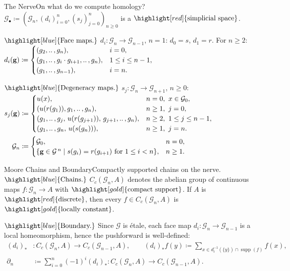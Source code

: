\documentclass[aspectratio=169]{beamer}
\renewcommand{\ldots}{
  \mathinner{{\ldotp}{\ldotp}}
}
\newcommand{\G}{\mathcal{G}}
\newcommand{\supp}{\operatorname{supp}}
\begin{document}
\begin{frame}{The Nerve}{On what do we compute homology?}
  \(\G_\bullet\coloneqq (\G_n,(d_i)_{i=0}^n,(s_j)_{j=0}^n)_{n\ge 0}\) is a \(\highlight[red]{\text{simplicial space}}\).
  \pause

  \(\highlight[blue]{\text{Face maps.}}\)
  \(d_i\colon \G_n\to \G_{n-1}\), \(n=1\): \(d_0=s\), \(d_1=r\). For \(n\ge 2\):
  \(
    d_i(\mathbf{g})\coloneqq
    \begin{cases}
      (g_2,\ldots,g_n), & i=0,\\
      (g_1,\ldots,g_i\cdot g_{i+1},\ldots,g_n), & 1\le i\le n-1,\\
      (g_1,\ldots,g_{n-1}), & i=n.
    \end{cases}
  \)
  \pause
  \vspace{0.2cm}

  \(\highlight[blue]{\text{Degeneracy maps.}}\)
  \(s_j\colon \G_n\to \G_{n+1}\), \(n\ge 0\):
  \vspace{-0.3em}
  \(
  \begin{aligned}
    s_j(\mathbf{g}) &\coloneqq \begin{cases}
      u(x), & n=0,\ x\in \G_0,\\
      (u(r(g_1)),g_1,\ldots,g_n), & n\ge 1,\ j=0,\\
      (g_1,\ldots,g_j,\,u(r(g_{j+1})),\,g_{j+1},\ldots,g_n), & n\ge 2,\ 1\le j\le n-1,\\
      (g_1,\ldots,g_n,\,u(s(g_n))), & n\ge 1,\ j=n.
    \end{cases}\\
   \G_n &\coloneqq
    \begin{cases}
      \G_0, & n=0,\\
      \{\mathbf{g} \in \G^{\,n}\mid s(g_i)=r(g_{i+1})\ \text{for}\ 1\le i<n\}, & n\ge 1.
    \end{cases}
  \end{aligned}
  \)
\end{frame}

\begin{frame}{Moore Chains and Boundary}{Compactly supported chains on the nerve.}
  \(\highlight[blue]{\text{Chains.}}\)
  \(C_c(\G_n,A)\) denotes the abelian group of continuous maps \(f\colon \G_n\to A\) with \(\highlight[gold]{\text{compact support}}\).
  If \(A\) is \(\highlight[red]{\text{discrete}}\), then every \(f\in C_c(\G_n,A)\) is \(\highlight[gold]{\text{locally constant}}\).
  \pause
  \vspace{0.3cm}

  \(\highlight[blue]{\text{Boundary.}}\)
  Since \(\G\) is \'etale, each face map \(d_i\colon \G_n\to \G_{n-1}\) is a local homeomorphism, hence the pushforward is well-defined:
  \[
    \begin{aligned}
      (d_i)_* &: C_c(\G_n,A)\to C_c(\G_{n-1},A),
      \qquad
      (d_i)_*f(y)\coloneqq \sum_{x\in d_i^{-1}(\{y\})\cap \supp(f)} f(x),\\[-1.2em]
      \partial_n &\coloneqq \sum_{i=0}^n (-1)^i (d_i)_*
      \colon C_c(\G_n,A)\to C_c(\G_{n-1},A).
    \end{aligned}
  \]
\end{frame}
\end{document}
